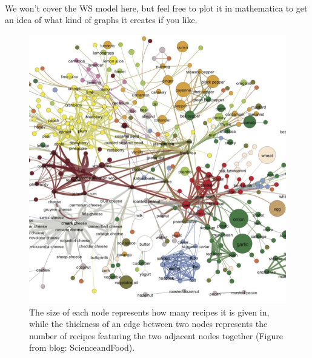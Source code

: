 \documentclass[12pt]{article}
\begin{document}
\\
We won't cover the WS model here, but feel free to plot it in mathematica to get an idea of what kind of graphs it creates if you like.
\begin{figure}[htbp]
\begin{center}
\includegraphics[]{foodnet.png}
\caption{The size of each node represents how many recipes it is given in, while the thickness of an edge between two nodes represents the number of recipes featuring the two adjacent nodes together (Figure from blog: ScienceandFood).}
\label{food}
\end{center}
\end{figure}
 
\end{document}
